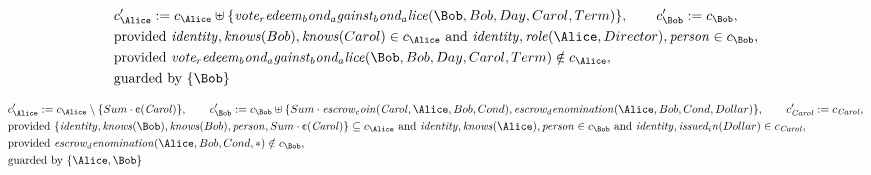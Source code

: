 \begin{align*}
&
c'_
{
\Alice
}
 := 
c_
{
\Alice
}
 \uplus 
\{
\mathit{
vote_redeem_bond_against_bond_alice
}
(
\Bob
,
Bob
,
Day
,
Carol
,
Term
)
\}
, \qquad 
c'_
{
\Bob
}
 := 
c_
{
\Bob
}
,\\
&
\text{provided } 
\mathit{
identity
}
,
\mathit{
knows
}
(
Bob
)
,
\mathit{
knows
}
(
Carol
)
 \in c_
{
\Alice
}
 \text{ and } 
\mathit{
identity
}
,
\mathit{
role
}
(
\Alice
,
Director
)
,
\mathit{
person
}
 \in c_
{
\Bob
}
,\\
&
\text{provided } 
\mathit{
vote_redeem_bond_against_bond_alice
}
(
\Bob
,
Bob
,
Day
,
Carol
,
Term
)
 \notin c_
{
\Alice
}
,\\
&
\text{guarded by } \{
\Bob
\}
\end{align*}

\begin{align*}
&
c'_
{
\Alice
}
 := 
c_
{
\Alice
}
 \setminus 
\{
Sum
\cdot
\text{\textcent}
(
\mathit{Carol}
)
\}
, \qquad 
c'_
{
\Bob
}
 := 
c_
{
\Bob
}
 \uplus 
\{
Sum
\cdot
\mathit{
escrow_coin
}
(
\mathit{Carol}
,
\Alice
,
Bob
,
Cond
)
,
\mathit{
escrow_denomination
}
(
\Alice
,
Bob
,
Cond
,
Dollar
)
\}
, \qquad 
c'_
{
\mathit{Carol}
}
 := 
c_
{
\mathit{Carol}
}
,\\
&
\text{provided } 
\{
\mathit{
identity
}
,
\mathit{
knows
}
(
\Bob
)
,
\mathit{
knows
}
(
Bob
)
,
\mathit{
person
}
,
Sum
\cdot
\text{\textcent}
(
\mathit{Carol}
)
\}
 \subseteq c_
{
\Alice
}
 \text{ and } 
\mathit{
identity
}
,
\mathit{
knows
}
(
\Alice
)
,
\mathit{
person
}
 \in c_
{
\Bob
}
 \text{ and } 
\mathit{
identity
}
,
\mathit{
issued_in
}
(
Dollar
)
 \in c_
{
\mathit{Carol}
}
,\\
&
\text{provided } 
\mathit{
escrow_denomination
}
(
\Alice
,
Bob
,
Cond
,
\ast
)
 \notin c_
{
\Bob
}
,\\
&
\text{guarded by } \{
\Alice
,
\Bob
\}
\end{align*}


